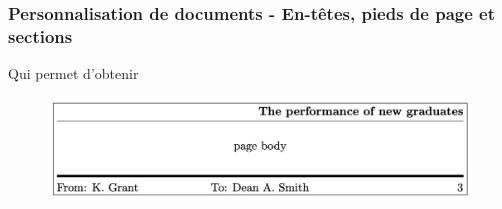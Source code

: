 \begin{frame}[fragile]
    \frametitle{Personnalisation de documents - En-têtes, pieds de page et sections}
    Qui permet d'obtenir
    \vfill
    \begin{figure}
        \centering
            \includegraphics[scale=0.3]{./figures/fancyhdr_2.png}
            \label{fig: fancyhdr_2}
    \end{figure}
    \vfill
\end{frame}

